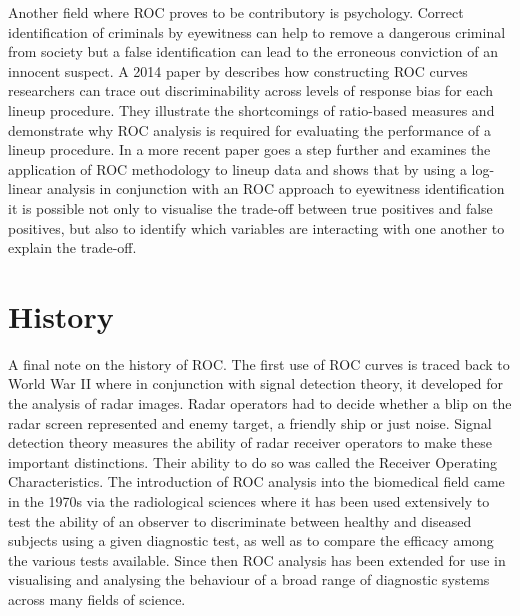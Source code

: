 Another field where ROC proves to be contributory is psychology. Correct identification of criminals by eyewitness can help to remove a dangerous criminal from society but a false identification can lead to the erroneous conviction of an innocent suspect. A 2014 paper by \citet{gronlund2014eyewitness} describes how constructing ROC curves researchers can trace out discriminability across levels of response bias for each lineup procedure. They illustrate the shortcomings of ratio-based measures and demonstrate why ROC analysis is required for evaluating the performance of a lineup procedure. In a more recent paper \citet{luby2017lineup} goes a step further and examines the application of ROC methodology to lineup data and shows that by using a log-linear analysis in conjunction with an ROC approach to eyewitness identification it is possible not only to visualise the trade-off between true positives and false positives, but also to identify which variables are interacting with one another to explain the trade-off.

\section{History}
A final note on the history of ROC. The first use of ROC curves is traced back to World War II where in conjunction with signal detection theory, it developed for the analysis of radar images. Radar operators had to decide whether a blip on the radar screen represented and enemy target, a friendly ship or just noise. Signal detection theory measures the ability of radar receiver operators to make these important distinctions. Their ability to do so was called the Receiver Operating Characteristics. The introduction of ROC analysis into the biomedical field came in the 1970s via the radiological sciences where it has been used extensively to test the ability of an observer to discriminate between healthy and diseased subjects using a given diagnostic test, as well as to compare the efficacy among the various tests available. Since then ROC analysis has been extended for use in visualising and analysing the behaviour of a broad range of diagnostic systems across many fields of science. 

